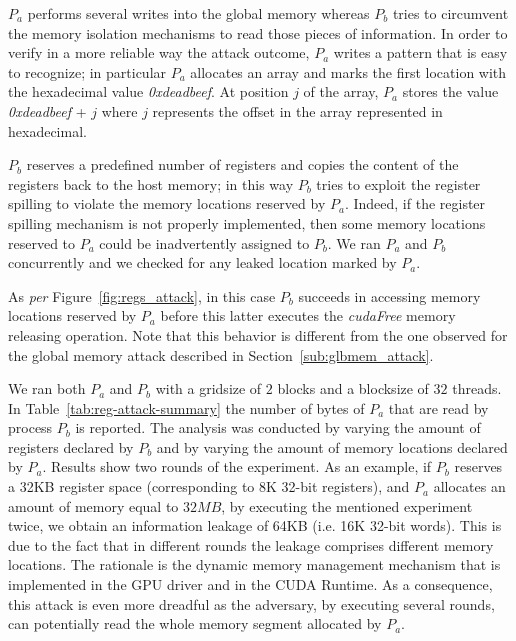 \documentclass[11pt,onecolumn,letterpaper]{IEEEtran}
\begin{document}
$P_a$ performs several writes into the global memory whereas $P_b$ tries to circumvent the memory isolation mechanisms to read those pieces of  information. 
In order to verify in a more reliable way the attack outcome, $P_a$ writes a pattern that is easy to recognize;
in particular $P_a$ allocates an array and marks the first location with the hexadecimal value \emph{0xdeadbeef}.
At position $j$ of the array, $P_a$ stores the value \emph{0xdeadbeef} + $j$ where $j$ represents 
the offset in the array represented in hexadecimal.

$P_b$ reserves a predefined number of registers and copies the content of the registers back to the host memory;
in this way $P_b$ tries to exploit the register spilling to violate the memory locations reserved by $P_a$. 
Indeed, if the register spilling mechanism is not properly implemented, 
then some memory locations reserved to $P_a$ could be inadvertently assigned to $P_b$. 
We ran $P_a$ and $P_b$ concurrently and we checked for any leaked location marked by $P_a$.

As {\em per} Figure~\ref{fig:regs_attack}, in this case $P_b$ succeeds in accessing memory locations reserved by $P_a$ 
before this latter executes the \emph{cudaFree} memory releasing operation. 
Note that this behavior is different from the one observed for the global memory attack described in Section~\ref{sub:glbmem_attack}. 

We ran both $P_a$ and $P_b$ with a gridsize of $2$ blocks and a blocksize of $32$ threads.
In Table~\ref{tab:reg-attack-summary} the number of bytes of $P_a$ that are read by process $P_b$ is reported.
The analysis was conducted by varying the amount of registers declared by $P_b$ and by varying the amount of memory locations declared by $P_a$.
Results show two rounds of the experiment.
As an example, if $P_b$ reserves a 32KB register space (corresponding to 8K 32-bit registers), and $P_a$ allocates an amount of memory equal to $32MB$,
by executing the mentioned experiment twice, we obtain an information leakage of 64KB (i.e. 16K 32-bit words).
This is due to the fact that in different rounds the leakage comprises different memory locations.
The rationale is the dynamic memory management mechanism that is implemented in the GPU driver and in the CUDA Runtime.
As a consequence, this attack is even more dreadful as the adversary, 
by executing several rounds, can potentially read the whole memory segment allocated by $P_a$. \\
\end{document}
